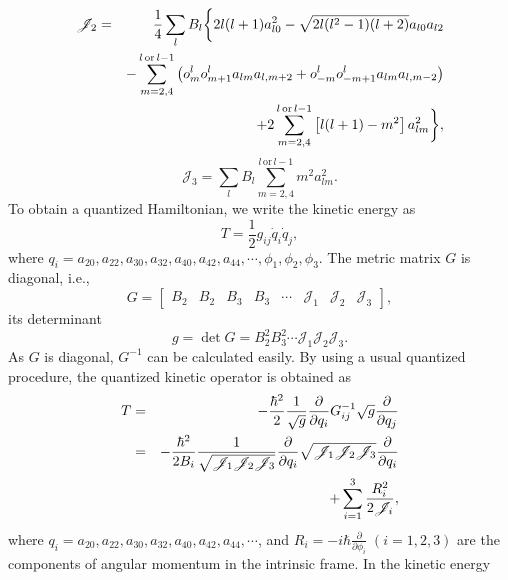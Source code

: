 \documentclass[twocolumn,prc,showpacs,preprintnumbers,superscriptaddress,floatfix]{revtex4}
\begin{document}
\begin{eqnarray}
\mathscr{J}_{2} &=&\frac{1}{4}\sum_{l}B_{l}\bigg\{2l(l+1)a_{l0}^{2}-\sqrt{%
2l(l^{2}-1)(l+2)}a_{l0}a_{l2}  \notag \\
&&-\sum_{m=2,4}^{l\,\text{or}\,l-1}\left(
o_{m}^{l}o_{m+1}^{l}a_{lm}a_{l,m+2}+o_{-m}^{l}o_{-m+1}^{l}a_{lm}a_{l,m-2}%
\right)  \notag \\
&&+2\sum_{m=2,4}^{l\,\text{or}\,l-1}\left[ l(l+1)-m^{2}\right] a_{lm}^{2}%
\bigg\},
\end{eqnarray}%
\begin{equation}
\mathscr{J}_{3}=\sum_{l}B_{l}\sum_{m=2,4}^{l\,\text{or}\,l-1}m^{2}a_{lm}^{2}.
\end{equation}%
To obtain a quantized Hamiltonian, we write the kinetic energy as
\begin{equation}
T=\frac{1}{2}g_{ij}\dot{q}_{i}\dot{q}_{j},
\end{equation}%
where $q_{i}=a_{20},a_{22},a_{30},a_{32},a_{40},a_{42},a_{44},\cdots ,\phi
_{1},\phi _{2},\phi _{3}$. The metric matrix $G$ is diagonal, i.e.,
\begin{equation}
G=\left[
\begin{array}{llllllll}
B_{2} & B_{2} & B_{3} & B_{3} & \cdots & \mathscr{J}_{1} & \mathscr{J}_{2} & %
\mathscr{J}_{3}%
\end{array}%
\right] ,
\end{equation}%
its determinant
\begin{equation}
g=\det G=B_{2}^{2}B_{3}^{2}\cdots \mathscr{J}_{1}\mathscr{J}_{2}\mathscr{J}%
_{3}.
\end{equation}%
As $G$ is diagonal, $G^{-1}$ can be calculated easily. By using a usual
quantized procedure, the quantized kinetic operator is obtained as
\begin{eqnarray}
T &=&-\frac{\hbar ^{2}}{2}\frac{1}{\sqrt{g}}\frac{\partial }{\partial q_{i}}%
G_{ij}^{-1}\sqrt{g}\frac{\partial }{\partial q_{j}}  \notag \\
&=&-\frac{\hbar ^{2}}{2B_{i}}\frac{1}{\sqrt{\mathscr{J}_{1}\mathscr{J}_{2}%
\mathscr{J}_{3}}}\frac{\partial }{\partial q_{i}}\sqrt{\mathscr{J}_{1}%
\mathscr{J}_{2}\mathscr{J}_{3}}\frac{\partial }{\partial q_{i}}  \notag \\
&&+\sum\limits_{i=1}^{3}\frac{R_{i}^{2}}{2\mathscr{J}_{i}},
\end{eqnarray}%
where $q_{i}=a_{20},a_{22},a_{30},a_{32},a_{40},a_{42},a_{44},\cdots $, and $%
R_{i}=-i\hbar \frac{\partial }{\partial \phi _{i}}\;(i=1,2,3)$ are the
components of angular momentum in the intrinsic frame. In the kinetic energy
\end{document}
